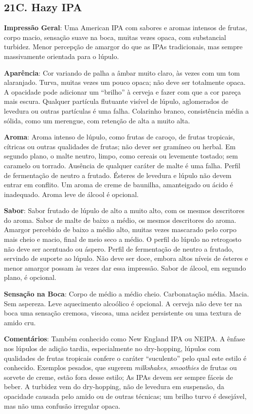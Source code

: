 \subsection*{21C. Hazy IPA}
\textbf{Impressão Geral}: Uma American IPA com sabores e aromas intensos de frutas, corpo macio, sensação suave na boca, muitas vezes opaca, com substancial turbidez. Menor percepção de amargor do que as IPAs tradicionais, mas sempre massivamente orientada para o lúpulo.

\textbf{Aparência}: Cor variando de palha a âmbar muito claro, às vezes com um tom alaranjado. Turva, muitas vezes um pouco opaca; não deve ser totalmente opaca. A opacidade pode adicionar um “brilho” à cerveja e fazer com que a cor pareça mais escura. Qualquer partícula flutuante visível de lúpulo, aglomerados de levedura ou outras partículas é uma falha. Colarinho branco, consistência média a sólida, como um merengue, com retenção de alta a muito alta.

\textbf{Aroma}: Aroma intenso de lúpulo, como frutas de caroço, de frutas tropicais, cítricas ou outras qualidades de frutas; não dever ser gramíneo ou herbal. Em segundo plano, o malte neutro, limpo, como cereais ou levemente tostado; sem caramelo ou torrado. Ausência de qualquer caráter de malte é uma falha. Perfil de fermentação de neutro a frutado. Ésteres de levedura e lúpulo não devem entrar em conflito. Um aroma de creme de baunilha, amanteigado ou ácido é inadequado. Aroma leve de álcool é opcional.

\textbf{Sabor}: Sabor frutado de lúpulo de alto a muito alto, com os mesmos descritores do aroma. Sabor de malte de baixo a médio, os mesmos descritores do aroma. Amargor percebido de baixo a médio alto, muitas vezes mascarado pelo corpo mais cheio e macio, final de meio seco a médio. O perfil do lúpulo no retrogosto não deve ser acentuado ou áspero. Perfil de fermentação de neutro a frutado, servindo de suporte ao lúpulo. Não deve ser doce, embora altos níveis de ésteres e menor amargor possam às vezes dar essa impressão. Sabor de álcool, em segundo plano, é opcional.

\textbf{Sensação na Boca}: Corpo de médio a médio cheio. Carbonatação média. Macia. Sem aspereza. Leve aquecimento alcoólico é opcional. A cerveja não deve ter na boca uma sensação cremosa, viscosa, uma acidez persistente ou uma textura de amido cru.

\textbf{Comentários}: Também conhecido como New England IPA ou NEIPA. A ênfase nos lúpulos de adição tardia, especialmente no dry-hopping, lúpulos com qualidades de frutas tropicais confere o caráter “suculento” pelo qual este estilo é conhecido. Exemplos pesados, que sugerem \textit{milkshakes}, \textit{smoothies} de frutas ou sorvete de creme, estão fora desse estilo; As IPAs devem ser sempre fáceis de beber. A turbidez vem do dry-hopping, não de levedura em suspensão, da opacidade causada pelo amido ou de outras técnicas; um brilho turvo é desejável, mas não uma confusão irregular opaca.


